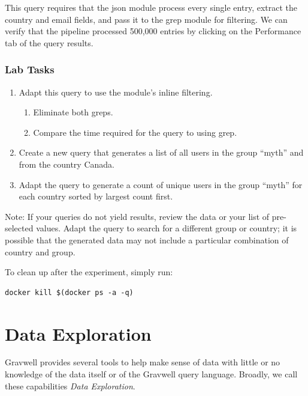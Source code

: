 This query requires that the json module process every single entry,
extract the country and email fields, and pass it to the grep module
for filtering. We can verify that the pipeline processed 500,000
entries by clicking on the Performance tab of the query results.

\subsubsection{Lab Tasks}

\begin{enumerate}
\item
  Adapt this query to use the  module's inline filtering.
	\begin{enumerate}
	\item Eliminate both greps.
	\item Compare the time required for the query to using grep.
	\end{enumerate}
\item
  Create a new query that generates a list of all users in the group
  ``myth'' and from the country Canada.
\item
  Adapt the query to generate a count of unique users in the
  group ``myth'' for each country sorted by largest count first.
\end{enumerate}

Note: If your queries do not yield results, review the data or your list
of pre-selected values. Adapt the query to search for a different group or country;
it is possible that the generated data may not include a particular combination
of country and group.

To clean up after the experiment, simply run:

\begin{Verbatim}[breaklines=true]
docker kill $(docker ps -a -q)
\end{Verbatim}



\clearpage
\section{Data Exploration}
\label{sec:data-explorer}

Gravwell provides several tools to help make sense of data with little or no knowledge of the data itself or of the Gravwell query language. Broadly, we call these capabilities \emph{Data Exploration}.


